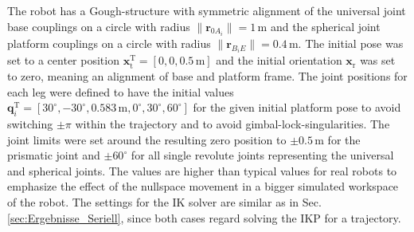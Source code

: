 \documentclass[robotics,article,submit,moreauthors,pdftex]{Definitions/mdpi}
\newcommand{\bm}[1]{\boldsymbol{#1}}
\newcommand{\transp}[0]{{\mathrm{T}}}
\begin{document}
The robot has a Gough-structure \cite{Merlet2006} with symmetric alignment of the universal joint base couplings on a circle with radius $\lVert\bm{r}_{0A_i}\rVert=1\,\mathrm{m}$ and the spherical joint platform couplings on a circle with radius $\lVert\bm{r}_{B_iE}\rVert=0.4\,\mathrm{m}$.
The initial pose was set to a center position $\bm{x}_\mathrm{t}^\transp=[0,0,0.5\,\mathrm{m}]$ and the initial orientation $\bm{x}_\mathrm{r}$ was set to zero, meaning an alignment of base and platform frame.
The joint positions for each leg were defined to have the initial values $\bm{q}_i^\transp=[30^\circ,-30^\circ,0.583\,\mathrm{m},0^\circ,30^\circ,60^\circ]$ for the given initial platform pose to avoid switching $\pm\pi$ within the trajectory and to avoid gimbal-lock-singularities.
The joint limits were set around the resulting zero position to $\pm0.5\,\mathrm{m}$ for the prismatic joint and $\pm60^\circ$ for all single revolute joints representing the universal and spherical joints.
The values are higher than typical values for real robots to emphasize the effect of the nullspace movement in a bigger simulated workspace of the robot.
The settings for the IK solver are similar as in Sec.\,\ref{sec:Ergebnisse_Seriell}, since both cases regard solving the IKP for a trajectory.
\end{document}
